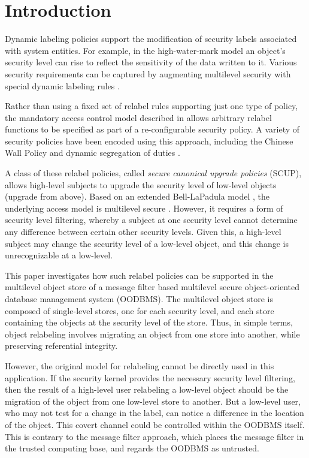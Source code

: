 \section{Introduction}

Dynamic labeling policies support the modification of security labels
associated with system entities. For example, in the high-water-mark
model \cite{Weissman:69} an object's security level can rise to
reflect the sensitivity of the data written to it.  Various security
requirements can be captured by augmenting multilevel security with
special dynamic labeling rules
\cite{Foley:JCS:92,Meadows:oak:90,Sandhu:94}.

Rather than using a fixed set of relabel rules supporting just one
type of policy, the 
mandatory access control model described in \cite{FGQ:oak:96}
allows arbitrary relabel  functions to be specified as part of a
re-configurable security policy.  A variety of security policies have
been encoded using this approach, including the Chinese Wall Policy
and dynamic segregation of duties \cite{foley:acm97,FGQ:oak:96}.

A class of these relabel policies, called  {\it secure canonical
upgrade policies\/} (SCUP), allows high-level subjects to upgrade the
security level of low-level objects (upgrade from above).  Based on an
extended Bell-LaPadula model \cite{bell86}, the underlying access model
is multilevel secure \cite{FGQ:oak:96}. 
However, it requires a form of security level
filtering, whereby a subject at one security level cannot determine any
difference between certain other security levels. Given this, a
high-level subject may change the security level of a low-level object,
and this change is unrecognizable at a low-level.

This paper investigates how such relabel policies can be supported in
the multilevel object store of a message filter \cite{jajodia} based
multilevel secure object-oriented database management system (OODBMS).  
The multilevel object
store is composed of single-level stores, one for each security level,
and each store containing the objects at the security level of the store.
Thus, in simple terms, object relabeling involves migrating an object 
from one store into another, while preserving referential integrity.

However, the original model for relabeling \cite{FGQ:oak:96} cannot be
directly used in this application.  If the security kernel provides the
necessary security level filtering, then the result of 
a high-level user relabeling a
low-level object should be the migration of the object from one
low-level store to another. But a low-level user, who may not test for
a change in the label, can notice a difference in the location of the
object.  This covert channel could be controlled within the OODBMS
itself. This is contrary to the message filter approach, which
places the message filter in the trusted computing base, and regards the
OODBMS as untrusted.



